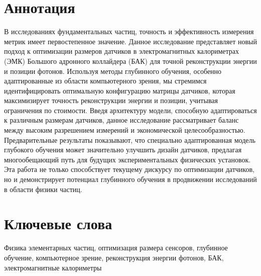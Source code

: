 \documentclass[a4paper,12pt]{extarticle}
\begin{document}
\newpage
\setcounter{page}{2}

{
	\hypersetup{linkcolor=black}
	\tableofcontents
}

\newpage

\newpage

\section*{Аннотация}   %
В исследованиях фундаментальных частиц, точность и эффективность измерения метрик имеет первостепенное значение. Данное исследование представляет новый подход к оптимизации размеров датчиков в электромагнитных калориметрах (ЭМК) Большого адронного коллайдера (БАК) для точной реконструкции энергии и позиции фотонов. Используя методы глубинного обучения, особенно адаптированные из области компьютерного зрения, мы стремимся идентифицировать оптимальную конфигурацию матрицы датчиков, которая максимизирует точность реконструкции энергии и позиции, учитывая ограничения по стоимости. Введя архитектуру модели, способную адаптироваться к различным размерам датчиков, данное исследование рассматривает баланс между высоким разрешением измерений и экономической целесообразностью. Предварительные результаты показывают, что специально адаптированная модель глубокого обучения может значительно улучшить дизайн датчиков, предлагая многообещающий путь для будущих экспериментальных физических установок. Эта работа не только способствует текущему дискурсу по оптимизации датчиков, но и демонстрирует потенциал глубинного обучения в продвижении исследований в области физики частиц.


\section*{Ключевые слова}
Физика элементарных частиц, оптимизация размера сенсоров, глубинное обучение, компьютерное зрение, реконструкция энергии фотонов, БАК, электромагнитные калориметры
\end{document}
